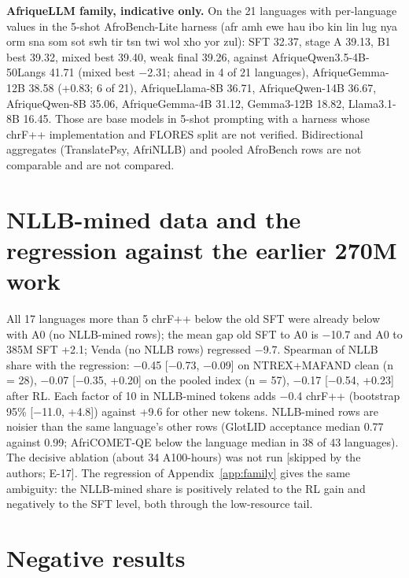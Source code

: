 \textbf{AfriqueLLM family, indicative only.} On the 21 languages with per-language values in the 5-shot AfroBench-Lite harness (afr amh ewe hau ibo kin lin lug nya orm sna som sot swh tir tsn twi wol xho yor zul): SFT 32.37, stage A 39.13, B1 best 39.32, mixed best 39.40, weak final 39.26, against AfriqueQwen3.5-4B-50Langs 41.71 (mixed best \ensuremath{-}2.31; ahead in 4 of 21 languages), AfriqueGemma-12B 38.58 (+0.83; 6 of 21), AfriqueLlama-8B 36.71, AfriqueQwen-14B 36.67, AfriqueQwen-8B 35.06, AfriqueGemma-4B 31.12, Gemma3-12B 18.82, Llama3.1-8B 16.45. Those are base models in 5-shot prompting with a harness whose chrF++ implementation and FLORES split are not verified.   Bidirectional aggregates (TranslatePsy, AfriNLLB) and pooled AfroBench rows are not comparable and are not compared.

\section{NLLB-mined data and the regression against the earlier 270M work}\label{app:nllblink}

All 17 languages more than 5 chrF++ below the old SFT were already below with A0 (no NLLB-mined rows); the mean gap old SFT to A0 is \ensuremath{-}10.7 and A0 to 385M SFT +2.1; Venda (no NLLB rows) regressed \ensuremath{-}9.7. Spearman of NLLB share with the regression: \ensuremath{-}0.45 [\ensuremath{-}0.73, \ensuremath{-}0.09] on NTREX+MAFAND clean (n = 28), \ensuremath{-}0.07 [\ensuremath{-}0.35, +0.20] on the pooled index (n = 57), \ensuremath{-}0.17 [\ensuremath{-}0.54, +0.23] after RL. Each factor of 10 in NLLB-mined tokens adds \ensuremath{-}0.4 chrF++ (bootstrap 95\% [\ensuremath{-}11.0, +4.8]) against +9.6 for other new tokens. NLLB-mined rows are noisier than the same language's other rows (GlotLID acceptance median 0.77 against 0.99; AfriCOMET-QE below the language median in 38 of 43 languages). The decisive ablation (about 34 A100-hours) was not run [skipped by the authors; E-17]. The regression of Appendix~\ref{app:family} gives the same ambiguity: the NLLB-mined share is positively related to the RL gain and negatively to the SFT level, both through the low-resource tail. 

\section{Negative results}\label{app:neg}

